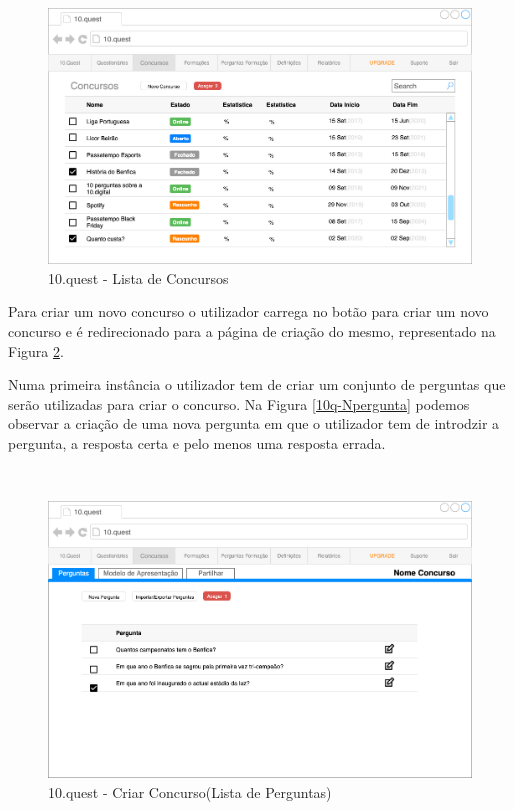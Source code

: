 \begin{figure}[ht!]
	\begin{center}
		\includegraphics[width=1\textwidth]{img/prototipos/5.png}
		\caption{10.quest - Lista de Concursos}
		\label{10q-concursos}
	\end{center}
\end{figure}

Para criar um novo concurso o utilizador carrega no botão para criar um novo concurso e é redirecionado para a página de criação do mesmo, representado na Figura \ref{10q-Cperguntas}.

Numa primeira instância o utilizador tem de criar um conjunto de perguntas que serão utilizadas para criar o concurso. Na Figura \ref{10q-Npergunta} podemos observar a criação de uma nova pergunta em que o utilizador tem de introdzir a pergunta, a resposta certa e pelo menos uma resposta errada. 


\newpage

\mbox{ }
\begin{figure}[ht!]
	\begin{center}
		\includegraphics[width=1\textwidth]{img/prototipos/18.png}
		\caption{10.quest - Criar Concurso(Lista de Perguntas)}
		\label{10q-Cperguntas}
	\end{center}
\end{figure}


